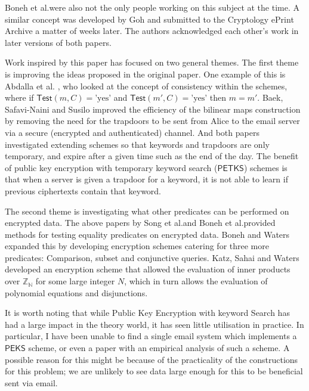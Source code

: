 \documentclass[a4paper,11pt]{article}
\begin{document}
    Boneh et al.\@ were also not the only people working on this subject at the time. A similar concept was developed by Goh \cite{cryptoeprint:2003:216} and submitted to the Cryptology ePrint Archive a matter of weeks later. The authors acknowledged each other's work in later versions of both papers.

    Work inspired by this paper has focused on two general themes. The first theme is improving the ideas proposed in the original paper. One example of this is Abdalla et al. \cite{abdalla:se-revisited}, who looked at the concept of consistency within the schemes, where if $\mathsf{Test}(m, C) = \text{'yes'}$ and $\mathsf{Test}(m', C) = \text{'yes'}$ then $m = m'$. Baek, Safavi-Naini and Susilo \cite{baek:se-revisited} improved the efficiency of the bilinear maps construction by removing the need for the trapdoors to be sent from Alice to the email server via a secure (encrypted and authenticated) channel. And both papers investigated extending schemes so that keywords and trapdoors are only temporary, and expire after a given time such as the end of the day. The benefit of public key encryption with temporary keyword search ($\mathsf{PETKS}$) schemes is that when a server is given a trapdoor for a keyword, it is not able to learn if previous ciphertexts contain that keyword.

    The second theme is investigating what other predicates can be performed on encrypted data. The above papers by Song et al.\@ and Boneh et al.\@ provided methods for testing equality predicates on encrypted data. Boneh and Waters \cite{boneh:predicate} expanded this by developing encryption schemes catering for three more predicates: Comparison, subset and conjunctive queries. Katz, Sahai and Waters \cite{katz:predicate} developed an encryption scheme that allowed the evaluation of inner products over $\mathbb{Z_N}$ for some large integer $N$, which in turn allows the evaluation of polynomial equations and disjunctions.

    It is worth noting that while Public Key Encryption with keyword Search has had a large impact in the theory world, it has seen little utilisation in practice. In particular, I have been unable to find a single email system which implements a $\mathsf{PEKS}$ scheme, or even a paper with an empirical analysis of such a scheme. A possible reason for this might be because of the practicality of the constructions for this problem; we are unlikely to see data large enough for this to be beneficial sent via email.
\end{document}
